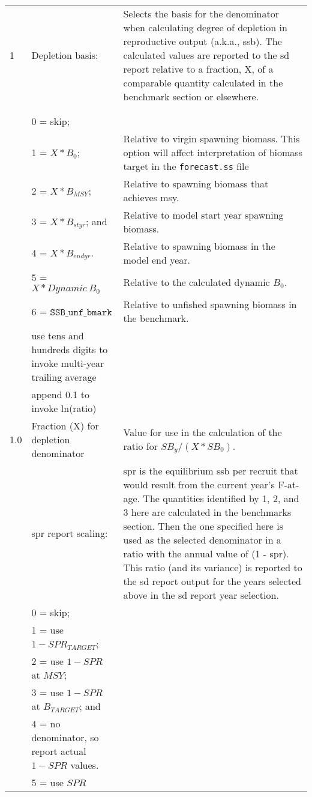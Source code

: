 {\begin{landscape}
\begin{longtable}{p{1.5cm} p{7.2cm} p{12.3cm}}
 \hline
 1 & Depletion basis: & \multirow{1}{12.3cm}[-0.25cm]{\parbox{12.3cm}{Selects the basis for the denominator when calculating degree of depletion in reproductive output (a.k.a., \gls{ssb}). The calculated values are reported to the \gls{sd} report relative to a fraction, X, of a comparable quantity calculated in the benchmark section or elsewhere.}} \Tstrut\\
   & & \\
   & & \\
   & 0 = skip; & \Tstrut \\
   & 1 = $X*B_{0}$; & Relative to virgin spawning biomass. This option will affect interpretation of biomass target in the \texttt{forecast.ss} file \\
   & 2 = $X*B_{MSY}$; & Relative to spawning biomass that achieves \gls{msy}. \\
   & 3 = $X*B_{styr}$; and & Relative to model start year spawning biomass. \\
   & 4 = $X*B_{endyr}$. & Relative to spawning biomass in the model end year. \\
   & 5 = $X*Dynamic~B_{0}$ & Relative to the calculated dynamic $B_{0}$. \\
   & 6 = $\mathtt{SSB\_unf\_bmark}$ & Relative to unfished spawning biomass in the benchmark. \\
   & use tens and hundreds digits to invoke multi-year trailing average & \\
   & append 0.1 to invoke ln(ratio) & \Bstrut\\
  
 \hline
 1.0 & Fraction (X) for depletion denominator & Value for use in the calculation of the ratio for $SB_{y}/(X*SB_{0})$. \Tstrut\Bstrut\\

 \pagebreak
 1 & \Gls{spr} report scaling: & \multirow{1}{12.3cm}[-0.25cm]{\parbox{12.3cm}{\gls{spr} is the equilibrium \gls{ssb} per recruit that would result from the current year's F-at-age. The quantities identified by 1, 2, and 3 here are calculated in the benchmarks section. Then the one specified here is used as the selected denominator in a ratio with the annual value of (1 - \gls{spr}). This ratio (and its variance) is reported to the \gls{sd} report output for the years selected above in the \gls{sd} report year selection.}} \Tstrut\\
   & 0 = skip; & \\
   & 1 = use $1-SPR_{TARGET}$; & \\
   & 2 = use $1-SPR$ at $MSY$; & \Tstrut\\
   & 3 = use $1-SPR$ at $B_{TARGET}$; and &  \Tstrut\\
   & 4 = no denominator, so report actual $1-SPR$ values. & \\
   & 5 = use $SPR$ & \\
  

\end{longtable}
\end{landscape}}
